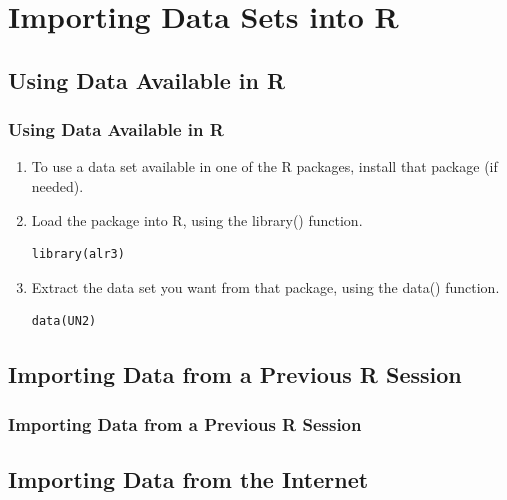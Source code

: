 

\section[Importing Data]{Importing Data Sets into R}

\subsection{Using Data Available in R}

\begin{frame}[fragile]
 \frametitle{Using Data Available in R}
\begin{enumerate}
\item To use a data set available in one of the R packages, install that package (if needed).

\item Load the package into R, using the \ttfamily library() \normalfont function. \\
	\begin{lstlisting}
library(alr3)
	\end{lstlisting}

\item Extract the data set you want from that package, using the \ttfamily data() \normalfont function.  
	\begin{lstlisting}
data(UN2)
	\end{lstlisting}

\end{enumerate}
\end{frame}

\subsection{Importing Data from a Previous R Session}

\begin{frame}[fragile]
 \frametitle{Importing Data from a Previous R Session}

\end{frame}



\subsection{Importing Data from the Internet}

